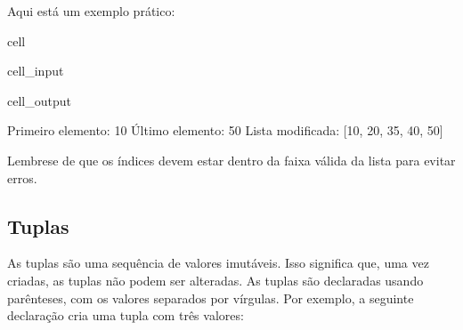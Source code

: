 \documentclass[letterpaper,10pt,english]{jupyterBook}
\begin{document}
\sphinxAtStartPar
Aqui está um exemplo prático:

\begin{sphinxuseclass}{cell}\begin{sphinxVerbatimInput}

\begin{sphinxuseclass}{cell_input}
\begin{sphinxVerbatim}[commandchars=\\\{\}]
  \PYG{p}{[}    \PYG{p}{]}

 \PYG{p}{[}\PYG{p}{]}
 \PYG{p}{[}\PYG{p}{]}

\PYG{p}{[}\PYG{p}{]}  
 
\end{sphinxVerbatim}

\end{sphinxuseclass}\end{sphinxVerbatimInput}
\begin{sphinxVerbatimOutput}

\begin{sphinxuseclass}{cell_output}
\begin{sphinxVerbatim}[commandchars=\\\{\}]
Primeiro elemento: 10
Último elemento: 50
Lista modificada: [10, 20, 35, 40, 50]
\end{sphinxVerbatim}

\end{sphinxuseclass}\end{sphinxVerbatimOutput}

\end{sphinxuseclass}
\sphinxAtStartPar
Lembre\sphinxhyphen{}se de que os índices devem estar dentro da faixa válida da lista para evitar erros.


\subsection{Tuplas}
\label{\detokenize{chapters/ch2/ch2:tuplas}}
\sphinxAtStartPar
As tuplas são uma sequência de valores imutáveis. Isso significa que, uma vez criadas, as tuplas não podem ser alteradas.
As tuplas são declaradas usando parênteses, com os valores separados por vírgulas. Por exemplo, a seguinte declaração cria uma tupla com três valores:
\end{document}
